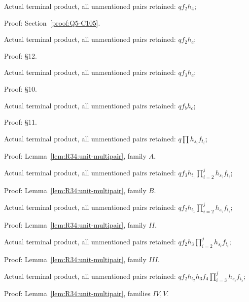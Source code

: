 \begin{description}[style=nextline,leftmargin=1.6em]
\item[{odd, \((1,\allowbreak  2,\allowbreak  4)\)}] Actual terminal product, all unmentioned pairs retained: \(qf_2h_4\);\par\noindent Proof: Section~\ref{proof:Q5-C105}.
\item[{odd, \((1,\allowbreak  2,\allowbreak  c),\allowbreak  c\ge5\)}] Actual terminal product, all unmentioned pairs retained: \(qf_2h_c\);\par\noindent Proof: §12.
\item[{odd, \((1,\allowbreak  3,\allowbreak  c),\allowbreak  c\ge4\)}] Actual terminal product, all unmentioned pairs retained: \(qf_3h_c\);\par\noindent Proof: §10.
\item[{odd, \((1,\allowbreak  b,\allowbreak  c),\allowbreak  4\le b<c\)}] Actual terminal product, all unmentioned pairs retained: \(qf_bh_c\);\par\noindent Proof: §11.
\item[{odd, \(j\ge2,\allowbreak  s_1\ge4\)}] Actual terminal product, all unmentioned pairs retained: \(q\prod h_{s_i}f_{t_i}\);\par\noindent Proof: Lemma~\ref{lem:R34:unit-multipair}, family \(A\).
\item[{odd, \(j\ge2,\allowbreak  s_1=3\)}] Actual terminal product, all unmentioned pairs retained: \(qf_3h_{t_1}\prod_{i=2}^j h_{s_i}f_{t_i}\);\par\noindent Proof: Lemma~\ref{lem:R34:unit-multipair}, family \(B\).
\item[{odd, \(j\ge2,\allowbreak  s_1=2,\allowbreak  t_1\ge4\)}] Actual terminal product, all unmentioned pairs retained: \(qf_2h_{t_1}\prod_{i=2}^j h_{s_i}f_{t_i}\);\par\noindent Proof: Lemma~\ref{lem:R34:unit-multipair}, family \(II\).
\item[{odd, \(j\ge2,\allowbreak (s_1,\allowbreak  t_1)=(2,\allowbreak  3),\allowbreak  s_2\ge5\)}] Actual terminal product, all unmentioned pairs retained: \(qf_2h_3\prod_{i=2}^j h_{s_i}f_{t_i}\);\par\noindent Proof: Lemma~\ref{lem:R34:unit-multipair}, family \(III\).
\item[{odd, \(j\ge2,\allowbreak (s_1,\allowbreak  t_1,\allowbreak  s_2)=(2,\allowbreak  3,\allowbreak  4)\)}] Actual terminal product, all unmentioned pairs retained: \(qf_2h_{t_2}h_3f_4\prod_{i=3}^j h_{s_i}f_{t_i}\);\par\noindent Proof: Lemma~\ref{lem:R34:unit-multipair}, families \(IV,V\).
\end{description}

